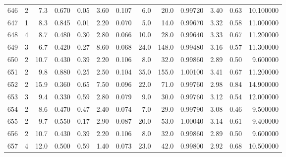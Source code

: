 \begin{tabular}{lrrrrrrrrrrrr}
646  &        2 &            7.3 &             0.670 &         0.05 &            3.60 &      0.107 &                  6.0 &                  20.0 &  0.99720 &  3.40 &       0.63 &  10.100000 \\
647  &        1 &            8.3 &             0.845 &         0.01 &            2.20 &      0.070 &                  5.0 &                  14.0 &  0.99670 &  3.32 &       0.58 &  11.000000 \\
648  &        4 &            8.7 &             0.480 &         0.30 &            2.80 &      0.066 &                 10.0 &                  28.0 &  0.99640 &  3.33 &       0.67 &  11.200000 \\
649  &        3 &            6.7 &             0.420 &         0.27 &            8.60 &      0.068 &                 24.0 &                 148.0 &  0.99480 &  3.16 &       0.57 &  11.300000 \\
650  &        2 &           10.7 &             0.430 &         0.39 &            2.20 &      0.106 &                  8.0 &                  32.0 &  0.99860 &  2.89 &       0.50 &   9.600000 \\
651  &        2 &            9.8 &             0.880 &         0.25 &            2.50 &      0.104 &                 35.0 &                 155.0 &  1.00100 &  3.41 &       0.67 &  11.200000 \\
652  &        2 &           15.9 &             0.360 &         0.65 &            7.50 &      0.096 &                 22.0 &                  71.0 &  0.99760 &  2.98 &       0.84 &  14.900000 \\
653  &        3 &            9.4 &             0.330 &         0.59 &            2.80 &      0.079 &                  9.0 &                  30.0 &  0.99760 &  3.12 &       0.54 &  12.000000 \\
654  &        2 &            8.6 &             0.470 &         0.47 &            2.40 &      0.074 &                  7.0 &                  29.0 &  0.99790 &  3.08 &       0.46 &   9.500000 \\
655  &        2 &            9.7 &             0.550 &         0.17 &            2.90 &      0.087 &                 20.0 &                  53.0 &  1.00040 &  3.14 &       0.61 &   9.400000 \\
656  &        2 &           10.7 &             0.430 &         0.39 &            2.20 &      0.106 &                  8.0 &                  32.0 &  0.99860 &  2.89 &       0.50 &   9.600000 \\
657  &        4 &           12.0 &             0.500 &         0.59 &            1.40 &      0.073 &                 23.0 &                  42.0 &  0.99800 &  2.92 &       0.68 &  10.500000 \\

\end{tabular}
